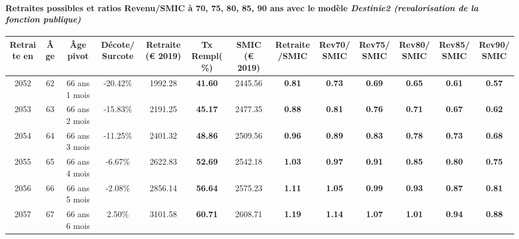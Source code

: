 \paragraph{Retraites possibles et ratios Revenu/SMIC à 70, 75, 80, 85, 90 ans avec le modèle \emph{Destinie2 (revalorisation de la fonction publique)}}  
 
{ \scriptsize \begin{center} 
\begin{tabular}[htb]{|c|c||c|c||c|c||c||c|c|c|c|c|c|} 
\hline 
 Retraite en &  Âge &  Âge pivot &  Décote/Surcote &  Retraite (\euro{} 2019) &  Tx Rempl(\%) &  SMIC (\euro{} 2019) &  Retraite/SMIC &  Rev70/SMIC &  Rev75/SMIC &  Rev80/SMIC &  Rev85/SMIC &  Rev90/SMIC \\ 
\hline \hline 
 2052 &  62 &  66 ans 1 mois &  -20.42\% &  1992.28 &  {\bf 41.60} &  2445.56 &  {\bf {\color{red} 0.81}} &  {\bf {\color{red} 0.73}} &  {\bf {\color{red} 0.69}} &  {\bf {\color{red} 0.65}} &  {\bf {\color{red} 0.61}} &  {\bf {\color{red} 0.57}} \\ 
\hline 
 2053 &  63 &  66 ans 2 mois &  -15.83\% &  2191.25 &  {\bf 45.17} &  2477.35 &  {\bf {\color{red} 0.88}} &  {\bf {\color{red} 0.81}} &  {\bf {\color{red} 0.76}} &  {\bf {\color{red} 0.71}} &  {\bf {\color{red} 0.67}} &  {\bf {\color{red} 0.62}} \\ 
\hline 
 2054 &  64 &  66 ans 3 mois &  -11.25\% &  2401.32 &  {\bf 48.86} &  2509.56 &  {\bf {\color{red} 0.96}} &  {\bf {\color{red} 0.89}} &  {\bf {\color{red} 0.83}} &  {\bf {\color{red} 0.78}} &  {\bf {\color{red} 0.73}} &  {\bf {\color{red} 0.68}} \\ 
\hline 
 2055 &  65 &  66 ans 4 mois &  -6.67\% &  2622.83 &  {\bf 52.69} &  2542.18 &  {\bf 1.03} &  {\bf {\color{red} 0.97}} &  {\bf {\color{red} 0.91}} &  {\bf {\color{red} 0.85}} &  {\bf {\color{red} 0.80}} &  {\bf {\color{red} 0.75}} \\ 
\hline 
 2056 &  66 &  66 ans 5 mois &  -2.08\% &  2856.14 &  {\bf 56.64} &  2575.23 &  {\bf 1.11} &  {\bf 1.05} &  {\bf {\color{red} 0.99}} &  {\bf {\color{red} 0.93}} &  {\bf {\color{red} 0.87}} &  {\bf {\color{red} 0.81}} \\ 
\hline 
 2057 &  67 &  66 ans 6 mois &  2.50\% &  3101.58 &  {\bf 60.71} &  2608.71 &  {\bf 1.19} &  {\bf 1.14} &  {\bf 1.07} &  {\bf 1.01} &  {\bf {\color{red} 0.94}} &  {\bf {\color{red} 0.88}} \\ 
\hline 
\hline 
\end{tabular} 
\end{center} } 

